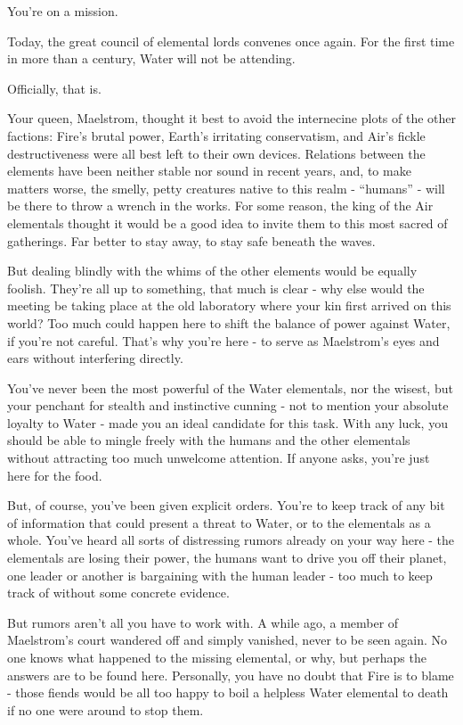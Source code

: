 \documentclass[char]{elementals}
\begin{document}
\name{\cMiniWater{}}


You’re on a mission. 

Today, the great council of elemental lords convenes once again. For the first time in more than a century, Water will not be attending.

Officially, that is.

Your queen, Maelstrom, thought it best to avoid the internecine plots of the other factions: Fire’s brutal power, Earth’s irritating conservatism, and Air’s fickle destructiveness were all best left to their own devices. Relations between the elements have been neither stable nor sound in recent years, and, to make matters worse, the smelly, petty creatures native to this realm - “humans” - will be there to throw a wrench in the works. For some reason, the king of the Air elementals thought it would be a good idea to invite them to this most sacred of gatherings. Far better to stay away, to stay safe beneath the waves.

But dealing blindly with the whims of the other elements would be equally foolish. They’re all up to something, that much is clear - why else would the meeting be taking place at the old laboratory where your kin first arrived on this world? Too much could happen here to shift the balance of power against Water, if you’re not careful. That’s why you’re here - to serve as Maelstrom’s eyes and ears without interfering directly.

You’ve never been the most powerful of the Water elementals, nor the wisest, but your penchant for stealth and instinctive cunning - not to mention your absolute loyalty to Water - made you an ideal candidate for this task. With any luck, you should be able to mingle freely with the humans and the other elementals without attracting too much unwelcome attention. If anyone asks, you’re just here for the food.

But, of course, you’ve been given explicit orders. You’re to keep track of any bit of information that could present a threat to Water, or to the elementals as a whole. You’ve heard all sorts of distressing rumors already on your way here - the elementals are losing their power, the humans want to drive you off their planet, one leader or another is bargaining with the human leader - too much to keep track of without some concrete evidence.

But rumors aren’t all you have to work with. A while ago, a member of Maelstrom’s court wandered off and simply vanished, never to be seen again. No one knows what happened to the missing elemental, or why, but perhaps the answers are to be found here. Personally, you have no doubt that Fire is to blame - those fiends would be all too happy to boil a helpless Water elemental to death if no one were around to stop them.
\end{document}
